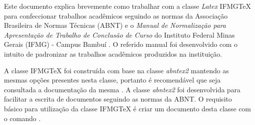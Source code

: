 Este documento explica brevemente como trabalhar com a classe \textit{Latex} {IFMG\TeX} para confeccionar trabalhos acadêmicos seguindo as normas da Associação Brasileira de Normas Técnicas (ABNT) e o \textit{Manual de Normalização para Apresentação de Trabalho de Conclusão de Curso} do Instituto Federal Minas Gerais (IFMG) - Campus Bambuí \cite{castro:2016:manual}.
O referido manual foi desenvolvido com o intuito de padronizar as trabalhos acadêmicos produzidos na instituição.

A classe {IFMG\TeX} foi construída com base na classe \textit{abntex2} mantendo as mesmas opções presentes nesta classe, portanto é recomendável que seja consultada a documentação da mesma \cite{araujo:2016:abntex2}.
A classe \textit{abntex2} foi desenvolvida para facilitar a escrita de documentos seguindo as normas da ABNT.
O requisito básico para utilização da classe {IFMG\TeX} é criar um documento desta classe com o comando .
